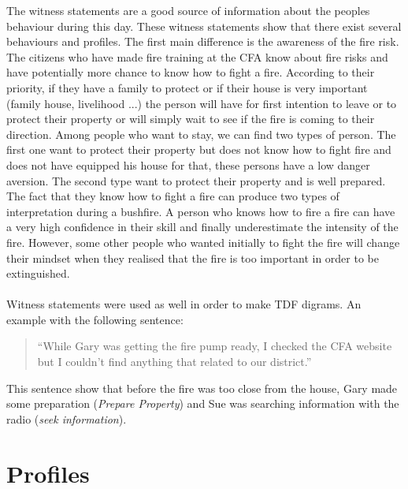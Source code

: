 \documentclass[12pt, a4paper]{memoir} %
\begin{document}
		The witness statements are a good source of information about the peoples behaviour during this day.
		These witness statements show that there exist several behaviours and profiles. The first main difference is the awareness of the fire risk.
		The citizens who have made fire training at the CFA know about fire risks and have potentially more chance to know how to fight a fire.
		According to their priority, if they have a family to protect or if their house is very important (family house, livelihood ...)
		the person will have for first intention to leave or to protect their property or will simply wait to see if the fire is coming to their direction.
		Among people who want to stay, we can find two types of person. The first one want to protect their property but does not know how to fight fire and does not have equipped his house for that, these persons have a low danger aversion.
		The second type want to protect their property and is well prepared. The fact that they know how to fight a fire can produce two types of interpretation during a bushfire.
		A person who knows how to fire a fire can have a very high confidence in their skill and finally underestimate the intensity of the fire.
		However, some other people who wanted initially to fight the fire will change their mindset when they realised that the fire is too important in order to be extinguished.
		\paragraph{}
		Witness statements were used as well in order to make TDF digrams. An example with the following sentence:
		\begin{quote}
			\textquotedblleft While Gary was getting the fire pump ready, I checked the CFA website but I couldn't find anything that related to our district.\textquotedblright \cite{exell}
		\end{quote}

		This sentence show that before the fire was too close from the house, Gary made some preparation (\textit{Prepare Property}) and Sue was searching information with the radio (\textit{seek information}).
	\section{Profiles}
\end{document}
